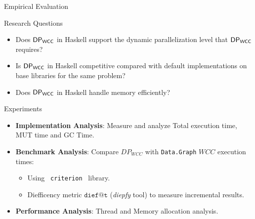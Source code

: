 \begin{frame}[fragile]{Empirical Evaluation}
  \begin{block}{Research Questions}
    \begin{itemize}
          \item Does $\mathsf{DP_{WCC}}$ in Haskell support the dynamic parallelization level that $\mathsf{DP_{WCC}}$ requires?
          \item Is $\mathsf{DP_{WCC}}$ in Haskell competitive compared with default implementations on base libraries for the same problem?
          \item Does $\mathsf{DP_{WCC}}$ in Haskell handle memory efficiently?
      \end{itemize}        
  \end{block}
  \begin{block}{Experiments}
    \begin{itemize}
      \item \textbf{Implementation Analysis}: Measure and analyze Total execution time, MUT time and GC Time.
      \item \textbf{Benchmark Analysis}: Compare $DP_{WCC}$ with \texttt{Data.Graph} $WCC$ execution times:
      \begin{itemize}
        \item Using \texttt{ criterion } library.
        \item Diefficency metric $\mathtt{dief@t}$ (\textit{diepfy} tool) to measure incremental results.
      \end{itemize}
      \item \textbf{Performance Analysis}: Thread and Memory allocation analysis.
    \end{itemize}
  \end{block}
\end{frame}

